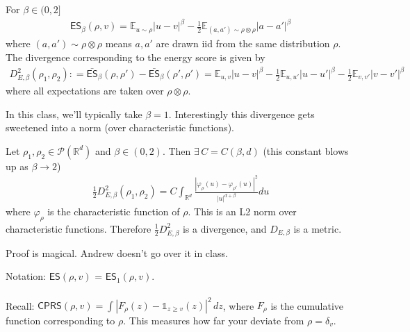 \documentclass[11pt,fleqn]{article}
\numberwithin{equation}{section}
\theoremstyle{definition}
\theoremstyle{definition}
\renewenvironment{proof}[1][\proofname]{\vspace{-10pt}\begin{replacementproof}}{\end{replacementproof}}
\begin{document}
\begin{definition}
	 For $\beta \in (0, 2]$
	\begin{align}
		\textsf{ES}_\beta(\rho, v) = \mathbb E_{u \sim \rho} |u - v|^\beta - \frac{1}{2} \mathbb E_{(a, a') \sim \rho \otimes \rho} |a -a'|^\beta
	\end{align}
	where $(a, a') \sim \rho \otimes \rho$ means $a,a'$ are drawn iid from the same distribution $\rho$. The divergence corresponding to the energy score is given by
	\begin{align}
		D^2_{E, \beta}(\rho_1, \rho_2) : = \bar{\textsf{ES}}_{\beta}(\rho, \rho') -  \bar{\textsf{ES}}_{\beta}(\rho', \rho') = \mathbb E_{u,v} |u - v|^\beta - \frac{1}{2} \mathbb E_{u,u'} |u- u'|^\beta - \frac{1}{2} \mathbb E_{v,v'} |v - v'
	|^\beta
	\end{align}
	where all expectations are taken over $\rho \otimes \rho$. 
\end{definition}
In this class, we'll typically take $\beta = 1$.
Interestingly this divergence gets sweetened into a norm (over characteristic functions).
\begin{theorem}
	Let $\rho_1, \rho_2 \in \mathcal P(\mathbb R^d)$ and $\beta \in (0,2)$. Then $\exists \,  C = C(\beta, d)$  (this constant blows up as $\beta \to 2$)
	\begin{align}
		\frac{1}{2} D^2_{E, \beta}(\rho_1, \rho_2) = C \int_{\mathbb R^d} \frac{| \varphi_\rho(u) - \varphi_{\rho'}(u)|^2}{|u|^{d + \beta}} du
	\end{align}
	where $\varphi_\rho$ is the characteristic function of $\rho$. This is an L2 norm over characteristic functions.  Therefore $\frac{1}{2}D^2_{E, \beta}$ is a divergence, and $D_{E, \beta}$ is a metric.
\end{theorem}
\begin{proof}
	Proof is magical. Andrew doesn't go over it in class.
\end{proof}

\begin{sidework}
	Notation: $\textsf{ES}(\rho, v)$ = $\textsf{ES}_1(\rho, v)$. \\
	\\
	Recall: $\textsf{CPRS}(\rho, v) = \int |F_\rho(z) - \mathds 1_{z \geq v}(z) |^2 \, dz$, where $F_\rho$ is the cumulative function corresponding to $\rho$. This measures how far your deviate from $\rho = \delta_v$.
\end{sidework}
\end{document}
